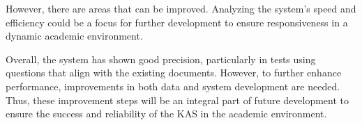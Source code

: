 \documentclass[runningheads]{llncs}
\begin{document}
However, there are areas that can be improved. Analyzing the system's speed and efficiency could be a focus for further development to ensure responsiveness in a dynamic academic environment.

Overall, the system has shown good precision, particularly in tests using questions that align with the existing documents. However, to further enhance performance, improvements in both data and system development are needed. Thus, these improvement steps will be an integral part of future development to ensure the success and reliability of the KAS in the academic environment.


%
%
%


%
\end{document}
